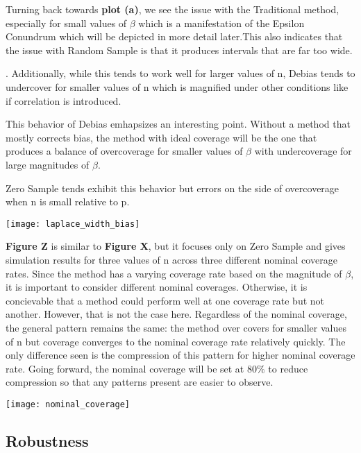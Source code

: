 
Turning back towards \textbf{plot (a)}, we see the issue with the Traditional method, especially for small values of $\beta$ which is a manifestation of the Epsilon Conundrum which will be depicted in more detail later.This also indicates that the issue with Random Sample is that it produces intervals that are far too wide.

. Additionally, while this tends to work well for larger values of n, Debias tends to undercover for smaller values of n which is magnified under other conditions like if correlation is introduced.

This behavior of Debias emhapsizes an interesting point. Without a method that mostly corrects bias, the method with ideal coverage will be the one that produces a balance of overcoverage for smaller values of $\beta$ with undercoverage for large magnitudes of $\beta$.

Zero Sample tends exhibit this behavior but errors on the side of overcoverage when n is small relative to p.

\texttt{[image: laplace\_width\_bias]}

\textbf{Figure Z} is similar to \textbf{Figure X}, but it focuses only on Zero Sample and gives simulation results for three values of n across three different nominal coverage rates. Since the method has a varying coverage rate based on the magnitude of $\beta$, it is important to consider different nominal coverages. Otherwise, it is concievable that a method could perform well at one coverage rate but not another. However, that is not the case here. Regardless of the nominal coverage, the general pattern remains the same: the method over covers for smaller values of n but coverage converges to the nominal coverage rate relatively quickly. The only difference seen is the compression of this pattern for higher nominal coverage rate. Going forward, the nominal coverage will be set at $80\%$ to reduce compression so that any patterns present are easier to observe.

\texttt{[image: nominal\_coverage]}

\subsection{Robustness}

